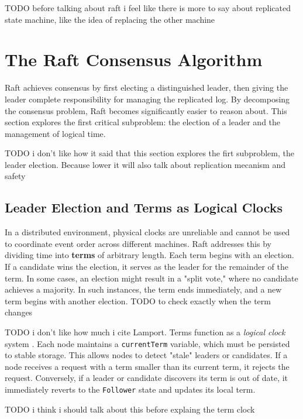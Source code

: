 TODO before talking about raft i feel like there is more to say about replicated state machine, like the idea of replacing the other machine

\section{The Raft Consensus Algorithm}
Raft achieves consensus by first electing a distinguished leader, then giving the leader complete responsibility for managing the replicated log. By decomposing the consensus problem, Raft becomes significantly easier to reason about. This section explores the first critical subproblem: the election of a leader and the management of logical time.

TODO i don't like how it said that this section explores the firt subproblem, the leader election. Because lower it will also talk about replication mecanism and safety

\subsection{Leader Election and Terms as Logical Clocks}
In a distributed environment, physical clocks are unreliable and cannot be used to coordinate event order across different machines. Raft addresses this by dividing time into \textbf{terms} of arbitrary length.
Each term begins with an election. If a candidate wins the election, it serves as the leader for the remainder of the term. In some cases, an election might result in a "split vote," where no candidate achieves a majority. In such instances, the term ends immediately, and a new term begins with another election. 
TODO to check exactly when the term changes

TODO i don't like how much i cite Lamport.
Terms function as a \textit{logical clock} system \cite{Lamport1978}. Each node maintains a \texttt{currentTerm} variable, which must be persisted to stable storage. This allows nodes to detect "stale" leaders or candidates. If a node receives a request with a term smaller than its current term, it rejects the request. Conversely, if a leader or candidate discovers its term is out of date, it immediately reverts to the \texttt{Follower} state and updates its local term.

TODO i think i should talk about this before explaing the term clock
